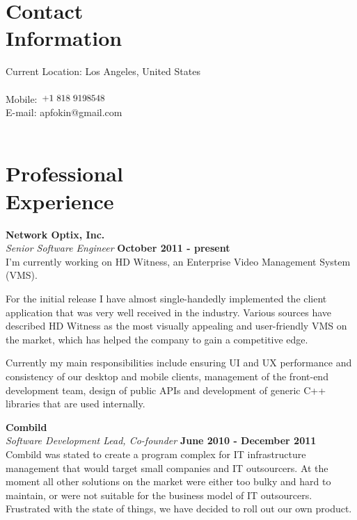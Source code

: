 \documentclass[margin,line]{CV}
\begin{document}
\begin{resume}


    \section{\mysidestyle Contact\\Information}
    Current Location: Los Angeles, United States \\
    \\
    Mobile: \includegraphics[height=0.35cm]{phone-us.png} \\ 
    E-mail: apfokin@gmail.com \\
    \\

    \section{\mysidestyle Professional\\Experience}
    \textbf{Network Optix, Inc.} \vspace{2mm}\\\vspace{1mm}%
    \textsl{Senior Software Engineer} \hfill \textbf{October 2011 - present}\\
    I'm currently working on HD Witness, an Enterprise Video Management System (VMS). 
    
    For the initial release I have almost single-handedly implemented the client application that was very well received in the industry. Various sources have described HD Witness as the most visually appealing and user-friendly VMS on the market, which has helped the company to gain a competitive edge.
    
    Currently my main responsibilities include ensuring UI and UX performance and consistency of our desktop and mobile clients, management of the front-end development team, design of public APIs and development of generic C++ libraries that are used internally.

    
	\textbf{Combild} \vspace{2mm}\\\vspace{1mm}%
	\textsl{Software Development Lead, Co-founder} \hfill \textbf{June 2010 - December 2011}\\
    Combild was stated to create a program complex for IT infrastructure management that would target small companies and IT outsourcers. At the moment all other solutions on the market were either too bulky and hard to maintain, or were not suitable for the business model of IT outsourcers. Frustrated with the state of things, we have decided to roll out our own product.
    

\end{resume}
\end{document}
